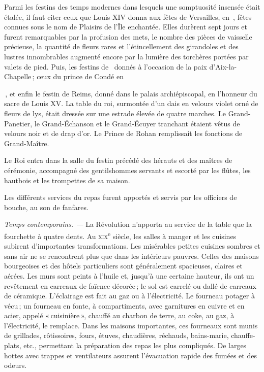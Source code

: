 Parmi les festins des temps modernes dans lesquels une somptuosité insensée
était étalée, il faut citer ceux que Louis XIV donna aux fêtes de Versailles,
en {\mmm} {\mmm}, fêtes connues sous le nom de Plaisirs de l'Île
enchantée. Elles durèrent sept jours et furent remarquables par la profusion
des mets, le nombre des pièces de vaisselle précieuse, la quantité de fleurs
rares et l'étincellement des girandoles et des lustres innombrables augmenté
encore par la lumière des torchères portées par {\mmm} valets de pied.
Puis, les festins de {\mmm} {\mmm} donnés à l'occasion de la paix
d'Aix-la-Chapelle ; ceux du prince de Condé en {\mmm {\mmm}, et
enfin le festin de Reims, donné dans le palais archiépiscopal, en l'honneur du
sacre de Louis XV. La table du roi, surmontée d'un dais en velours violet orné
de fleurs de lys, était dressée sur une estrade élevée de quatre marches. Le
Grand-Panetier, le Grand-Échanson et le Grand-Écuyer tranchant étaient vêtus de
velours noir et de drap d'or. Le Prince de Rohan remplissait les fonctions de
Grand-Maître.

Le Roi entra dans la salle du festin précédé des hérauts et des maîtres de
cérémonie, accompagné des gentilshommes servants et escorté par les flûtes, les
hautbois et les trompettes de sa maison.

Les différents services du repas furent apportés et servis par les officiers de
bouche, au son de fanfares.

\sk

\textit{Temps contemporains. —} La Révolution n'apporta au service de la table
que la fourchette à quatre dents. Au \textsc{xix}\textsuperscript{e} siècle,
les salles à manger et les cuisines subirent d'importantes transformations. Les
misérables petites cuisines sombres et sans air ne se rencontrent plus que dans
les intérieurs pauvres. Celles des maisons bourgeoises et des hôtels
particuliers sont généralement spacieuses, claires et aérées. Les murs sont
peints à l'huile et, jusqu'à une certaine hauteur, ils ont un revêtement en
carreaux de faïence décorée ; le sol est carrelé ou dallé de carreaux de
céramique. L'éclairage est fait au gaz ou à l'électricité. Le fourneau potager
à vécu ; un fourneau en fonte, à compartiments, avec garnitures en cuivre et en
acier, appelé « cuisinière », chauffé au charbon de terre, au coke, au gaz,
à l'électricité, le remplace. Dans les maisons importantes, ces fourneaux sont
munis de grillades, rôtissoires, fours, étuves, chaudières, réchauds,
bains-marie, chauffe-plats, etc., permettant la préparation des repas les plus
compliqués. De larges hottes avec trappes et ventilateurs assurent l'évacuation
rapide des fumées et des odeurs.

}
